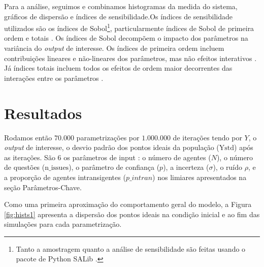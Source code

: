   
Para a análise, seguimos  e combinamos
histogramas da medida do sistema, gráficos de dispersão e índices de
sensibilidade.Os índices de sensibilidade utilizados são os índices de
Sobol\footnote{Tanto a amostragem quanto a análise de sensibilidade são feitas
  usando o pacote de Python SALib \cite{herman2017salib}.}, particularmente
índices de Sobol de primeira ordem e totais \cite{saltelli2008global}. Os
índices de Sobol decompõem o impacto dos parâmetros na variância do
\textit{output} de interesse. Os índices de primeira ordem incluem contribuições
lineares e não-lineares dos parâmetros, mas não efeitos interativos
\cite{ten2016sensitivity}. Já índices totais incluem todos os efeitos de ordem
maior decorrentes das interações entre os parâmetros \cite{saltelli2008global}.

\section{Resultados}

Rodamos então \(70.000\) parametrizações por \(1.000.000\) de iterações tendo
por \(Y\), o \textit{output} de interesse, o desvio padrão  dos pontos ideais da
população (\(\text{Ystd}\)) após as iterações. São \(6\) os parâmetros de input
: o número de agentes (\(N\)), o número de questões (\(\text{n\_issues}\)), o
parâmetro de confiança (\(p\)), a incerteza (\(\sigma\)),  o ruído \(\rho\), e a
proporção de agentes intransigentes (\(p\_intran\)) nos
limiares apresentados na seção Parâmetros-Chave.

Como uma primeira aproximação do comportamento geral do modelo, a Figura
\ref{fig:hists1} apresenta a dispersão dos pontos ideais na condição inicial e
ao fim das simulações para cada parametrização.

